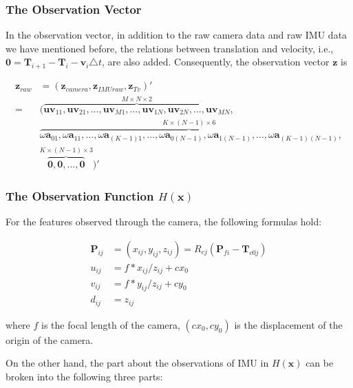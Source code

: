 \documentclass[12pt]{article}   %
\begin{document}
\subsubsection{The Observation Vector}

In the observation vector, in addition to the raw camera data and raw IMU data we have mentioned before, the relations between translation and velocity, i.e., $ \textbf{0} = \textbf{T}_{i+1} - \textbf{T}_{i} - \textbf{v}_{i} \triangle t$, are also added. Consequently, the observation vector $\textbf{z}$ is

\begin{align}
\textbf{z}_{raw} &= (\textbf{z}_{camera}, \textbf{z}_{IMUraw}, \textbf{z}_{Tv})' \nonumber \\
	=& (\overbrace{\textbf{uv}_{11}, \textbf{uv}_{21}, ... , \textbf{uv}_{M1}, ..., \textbf{uv}_{1N}, \textbf{uv}_{2N}, ... , \textbf{uv}_{MN}}^{M \times N \times 2}, \nonumber \\ 
	& \overbrace{\omega\textbf{a}_{01}, \omega\textbf{a}_{11}, ... , \omega\textbf{a}_{(K-1)1}, ..., \omega\textbf{a}_{0(N-1)}, \omega\textbf{a}_{1(N-1)}, ... , \omega\textbf{a}_{(K-1)(N-1)}}^{K \times (N-1) \times 6}, \\
	& \overbrace{\textbf{0}, \textbf{0}, ... , \textbf{0}}^{K \times (N-1) \times 3})' 
\end{align}




\subsubsection{The Observation Function $H(\textbf{x})$}

For the features observed through the camera, the following formulas hold:

\begin{align}
\textbf{P}_{ij} &= (x_{ij}, y_{ij}, z_{ij}) = R_{cj} (\textbf{P}_{fi} - \textbf{T}_{c0j}) \label{formu:pij} \\
u_{ij} &= f * x_{ij} / z_{ij} + cx_0 \label{formu:uij} \\
v_{ij} &= f * y_{ij} / z_{ij} + cy_0 \label{formu:vij} \\
d_{ij} &= z_{ij} \label{formu:dij}
\end{align}

where $f$ is the focal length of the camera, $(cx_0, cy_0)$ is the displacement of the origin of the camera.

On the other hand, the part about the observations of IMU in $H(\textbf{x})$ can be broken into the following three parts:
\end{document}
